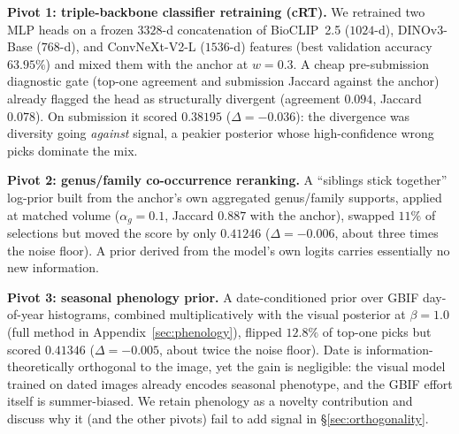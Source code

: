 \textbf{Pivot 1: triple-backbone classifier retraining (cRT).} We retrained two MLP heads on a
frozen $3328$-d concatenation of BioCLIP~2.5 ($1024$-d), DINOv3-Base ($768$-d), and ConvNeXt-V2-L
($1536$-d) features (best validation accuracy $63.95\%$) and mixed them with the anchor at $w{=}0.3$. A cheap pre-submission diagnostic
gate (top-one agreement and submission Jaccard against the anchor) already flagged the head
as structurally divergent (agreement $0.094$, Jaccard $0.078$). On submission it scored
$\mathbf{0.38195}$ ($\Delta{=}{-}0.036$): the divergence was diversity going \emph{against} signal,
a peakier posterior whose high-confidence wrong picks dominate the mix.

\textbf{Pivot 2: genus/family co-occurrence reranking.} A ``siblings stick together'' log-prior
built from the anchor's own aggregated genus/family supports, applied at matched volume
($\alpha_g{=}0.1$, Jaccard $0.887$ with the anchor), swapped $11\%$ of selections but moved the
score by only $\mathbf{0.41246}$ ($\Delta{=}{-}0.006$, about three times the noise floor). A prior derived
from the model's own logits carries essentially no new information.

\textbf{Pivot 3: seasonal phenology prior.} A date-conditioned prior over GBIF day-of-year
histograms, combined multiplicatively with the visual posterior at $\beta{=}1.0$ (full method in
Appendix~\ref{sec:phenology}), flipped $12.8\%$ of top-one picks but scored $\mathbf{0.41346}$
($\Delta{=}{-}0.005$, about twice the noise floor). Date is information-theoretically orthogonal to the
image, yet the gain is negligible: the visual model trained on dated images already encodes
seasonal phenotype, and the GBIF effort itself is summer-biased. We retain phenology as a novelty
contribution and discuss why it (and the other pivots) fail to add signal in \S\ref{sec:orthogonality}.
